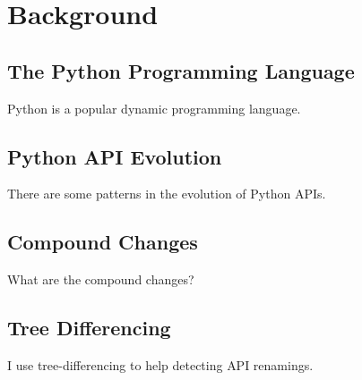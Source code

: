 \chapter{Background}
\label{chap:background}

\section{The Python Programming Language}

Python is a popular dynamic programming language.

\section{Python API Evolution}

There are some patterns in the evolution of Python APIs.

\section{Compound Changes}

What are the compound changes?

\section{Tree Differencing}

I use tree-differencing to help detecting API renamings.
